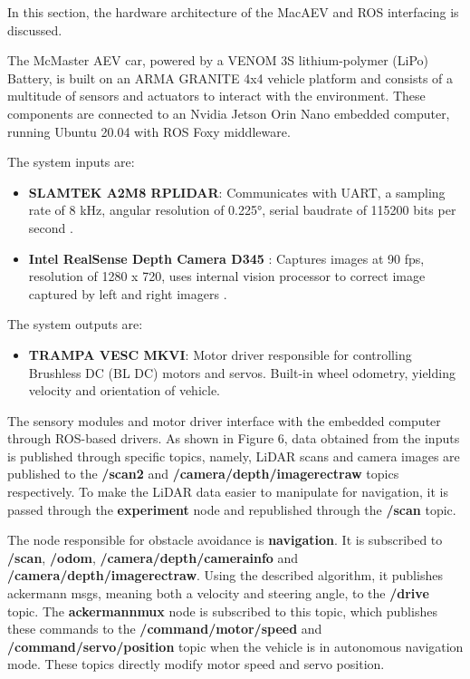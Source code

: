 \documentclass[conference]{IEEEtran}
\begin{document}
In this section, the hardware architecture of the MacAEV and ROS interfacing is discussed.  

The McMaster AEV car, powered by a VENOM 3S lithium-polymer (LiPo) Battery, is built on an ARMA GRANITE 4x4 vehicle platform and consists of a multitude of sensors and actuators to interact with the environment. These components are connected to an Nvidia Jetson Orin Nano embedded computer, running Ubuntu 20.04 with ROS Foxy middleware.

The system inputs are:
\begin{itemize}
    \item \textbf{SLAMTEK A2M8 RPLIDAR}: Communicates with UART, a sampling rate of 8 kHz, angular resolution of \ang{0.225}, serial baudrate of 115200 bits per second \cite{b6}.
    \item \textbf{Intel RealSense Depth Camera D345} : Captures images at 90 fps, resolution of 1280 x 720, uses internal vision processor to correct image captured by left and right imagers \cite{b7}.
\end{itemize}

The system outputs are:

\begin{itemize}
    \item \textbf{TRAMPA VESC MKVI}: Motor driver responsible for controlling Brushless DC (BL DC) motors and servos. Built-in wheel odometry, yielding velocity and orientation of vehicle.
\end{itemize} 

The sensory modules and motor driver interface with the embedded computer through ROS-based drivers. As shown in Figure 6, data obtained from the inputs is published through specific topics, namely, LiDAR scans and camera images are published to the \textbf{/scan2} and \textbf{/camera/depth/image\textunderscore rect\textunderscore raw} topics respectively. To make the LiDAR data easier to manipulate for navigation, it is passed through the \textbf{experiment} node and republished through the \textbf{/scan} topic. 

The node responsible for obstacle avoidance is \textbf{navigation}. It is subscribed to \textbf{/scan}, \textbf{/odom}, \textbf{/camera/depth/camera\textunderscore info} and \textbf{/camera/depth/image\textunderscore rect\textunderscore raw}. Using the described algorithm, it publishes ackermann msgs, meaning both a velocity and steering angle, to the \textbf{/drive} topic. The \textbf{ackermann\textunderscore mux} node is subscribed to this topic, which publishes these commands to the \textbf{/command/motor/speed} and \textbf{/command/servo/position} topic when the vehicle is in autonomous navigation mode. These topics directly modify motor speed and servo position. 
\end{document}
